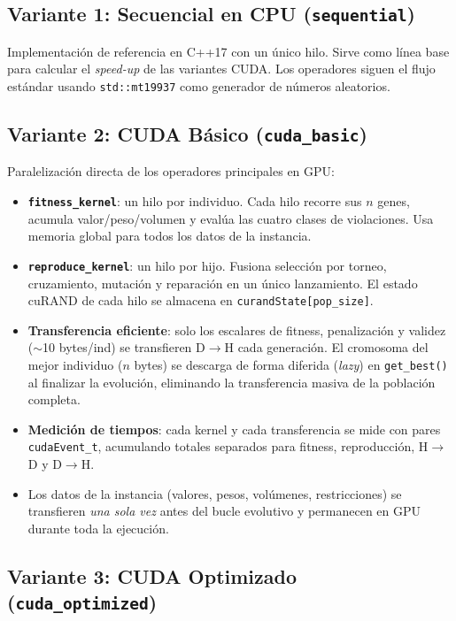 \subsection{Variante 1: Secuencial en CPU (\texttt{sequential})}

Implementación de referencia en C++17 con un único hilo. Sirve como línea base para
calcular el \emph{speed-up} de las variantes CUDA. Los operadores siguen el flujo
estándar usando \texttt{std::mt19937} como generador de números aleatorios.

\subsection{Variante 2: CUDA Básico (\texttt{cuda\_basic})}

Paralelización directa de los operadores principales en GPU:

\begin{itemize}
  \item \textbf{\texttt{fitness\_kernel}}: un hilo por individuo. Cada hilo recorre
    sus $n$ genes, acumula valor/peso/volumen y evalúa las cuatro clases de violaciones.
    Usa memoria global para todos los datos de la instancia.
  \item \textbf{\texttt{reproduce\_kernel}}: un hilo por hijo. Fusiona selección por
    torneo, cruzamiento, mutación y reparación en un único lanzamiento. El estado
    cuRAND de cada hilo se almacena en \texttt{curandState[pop\_size]}.
  \item \textbf{Transferencia eficiente}: solo los escalares de fitness, penalización
    y validez ($\sim$10 bytes/ind) se transfieren D$\to$H cada generación. El
    cromosoma del mejor individuo ($n$ bytes) se descarga de forma diferida
    (\emph{lazy}) en \texttt{get\_best()} al finalizar la evolución, eliminando
    la transferencia masiva de la población completa.
  \item \textbf{Medición de tiempos}: cada kernel y cada transferencia se mide con
    pares \texttt{cudaEvent\_t}, acumulando totales separados para fitness,
    reproducción, H$\to$D y D$\to$H.
  \item Los datos de la instancia (valores, pesos, volúmenes, restricciones) se
    transfieren \emph{una sola vez} antes del bucle evolutivo y permanecen en GPU
    durante toda la ejecución.
\end{itemize}

\subsection{Variante 3: CUDA Optimizado (\texttt{cuda\_optimized})}

